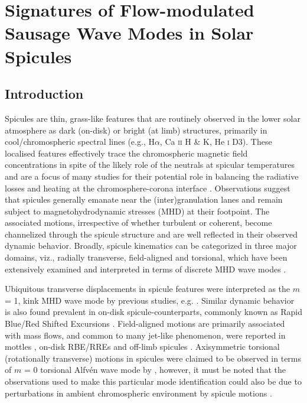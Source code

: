 \documentclass[12pt]{ociamthesis}
\begin{document}
\baselineskip=18pt

\setcounter{secnumdepth}{3}
\setcounter{tocdepth}{3}

\setcounter{chapter}{2}


\chapter{Signatures of Flow-modulated Sausage Wave Modes in Solar Spicules}
\section{Introduction}
Spicules are thin, grass-like features that are routinely observed in the lower solar atmosphere as dark (on-disk) or bright (at limb) structures, primarily in cool/chromospheric spectral lines (e.g., H$\alpha$, Ca \textsc{ii} H \& K, He \textsc{i} D3). These localised features effectively trace the chromospheric magnetic field concentrations in spite of the likely role of the neutrals at spicular temperatures and are a focus of many studies for their potential role in balancing the radiative losses and heating at the chromosphere-corona interface \citep{Tsiropoula2012}. Observations suggest that spicules generally emanate near the (inter)granulation lanes and remain subject to magnetohydrodynamic stresses (MHD) at their footpoint. The associated motions, irrespective of whether turbulent or coherent, become channelized through the spicule structure and are well reflected in their observed dynamic behavior. Broadly, spicule kinematics can be categorized in three major domains, viz., radially transverse, field-aligned and torsional, which have been extensively examined and interpreted in terms of discrete MHD wave modes \citep[see review:][]{Zaqarashvili2009}. 

Ubiquitous transverse displacements in spicule features were interpreted as the $m$ = 1, kink MHD wave mode by previous studies, e.g.  \citep{Kukhianidze2006, DePontieu2007, Ebadi2014, Sharma2017}.  Similar dynamic behavior is also found prevalent in on-disk spicule-counterparts, commonly known as Rapid Blue/Red Shifted Excursions \citep[RBE,RREs:][]{RouppevanderVoort2009}. Field-aligned motions are primarily associated with mass flows, and common to many jet-like phenomenon, were reported in mottles \citep{Loughhead1974}, on-disk RBE/RREs \citep{Sekse2013} and off-limb spicules \citep{Pereira2012}. Axisymmetric torsional (rotationally transverse) motions in spicules were claimed to be observed in terms of $m$ = 0 torsional Alfv\'en wave mode by \citet{DePontieu2012}, however, it must be noted that the observations used to make this particular mode identification could also be due to perturbations in ambient chromospheric environment by spicule motions \citep{Goossens2014, Sharma2017}. 
\end{document}
